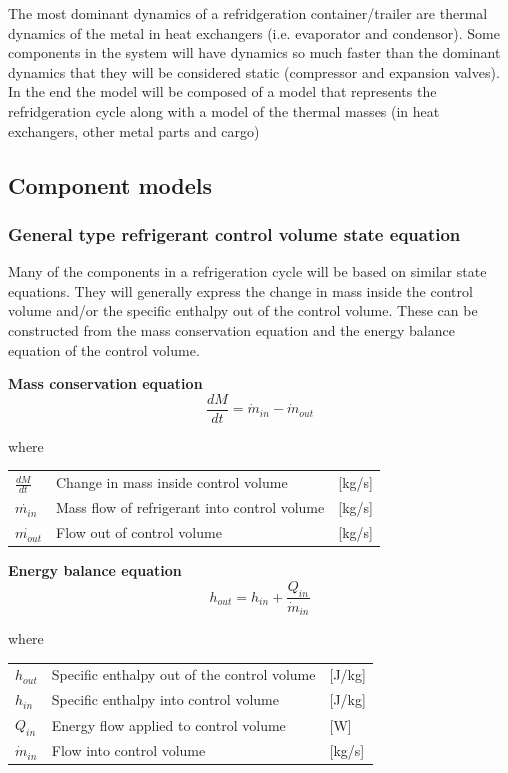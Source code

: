 The most dominant dynamics of a refridgeration container/trailer are thermal dynamics of the metal in heat exchangers (i.e. evaporator and condensor). Some components in the system will have dynamics so much faster than the dominant dynamics that they will be considered static (compressor and expansion valves).
In the end the model will be composed of a model that represents the refridgeration cycle along with a model of the thermal masses (in heat exchangers, other metal parts and cargo)


\subsection{Component models}

\subsubsection{General type refrigerant control volume state equation}
Many of the components in a refrigeration cycle will be based on similar state equations. They will generally express the change in mass inside the control volume and/or the specific enthalpy out of the control volume. These can be constructed from the mass conservation equation and the energy balance equation of the control volume.

\textbf{Mass conservation equation} \\
\begin{equation} \label{eq:GeneralTypeControlVol_MassConservation}
	\frac{dM}{dt} = \dot{m}_{in} - \dot{m}_{out}
\end{equation}

where 
\begin{center}
	\begin{tabular}{l p{8cm} l}
		$\frac{dM}{dt}$ 	& Change in mass inside control volume & [\si{kg}/\si{s}]\\ 
		$\dot{m_{in}}$ 		& Mass flow of refrigerant into control volume & [\si{kg}/\si{s}]\\
		$\dot{m_{out}}$ 	& Flow out of control volume & [\si{kg}/\si{s}]\\
	\end{tabular}
\end{center}

\textbf{Energy balance equation}
\begin{equation}
	h_{out} = h_{in} + \frac{Q_{in}}{\dot{m}_{in}}
\end{equation}

where
\begin{center}
	\begin{tabular}{l p{8cm} l}
		$h_{out}$ 		& Specific enthalpy out of the control volume & [\si{J}/\si{kg}]\\ 
		$h_{in}$ 		& Specific enthalpy into control volume & [\si{J}/\si{kg}]\\ 
		$Q_{in}$ 		& Energy flow applied to control volume& [\si{W}]\\
		$\dot{m}_{in}$ 	& Flow into control volume & [\si{kg}/\si{s}]\\
	\end{tabular}
\end{center}

